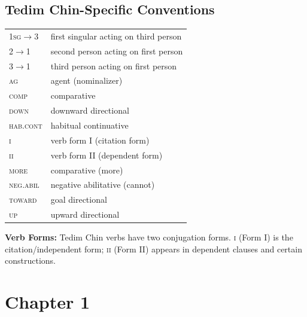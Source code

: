 \documentclass[11pt,a4paper]{article}
\begin{document}
\subsection*{Tedim Chin-Specific Conventions}
\begin{tabular}{@{}ll@{}}
\textsc{1sg$\rightarrow$3} & first singular acting on third person \\
\textsc{2$\rightarrow$1} & second person acting on first person \\
\textsc{3$\rightarrow$1} & third person acting on first person \\
\textsc{ag} & agent (nominalizer) \\
\textsc{comp} & comparative \\
\textsc{down} & downward directional \\
\textsc{hab.cont} & habitual continuative \\
\textsc{i} & verb form I (citation form) \\
\textsc{ii} & verb form II (dependent form) \\
\textsc{more} & comparative (more) \\
\textsc{neg.abil} & negative abilitative (cannot) \\
\textsc{toward} & goal directional \\
\textsc{up} & upward directional \\
\end{tabular}

\vspace{1em}
\noindent\textbf{Verb Forms:} Tedim Chin verbs have two conjugation forms.
\textsc{i} (Form I) is the citation/independent form; \textsc{ii} (Form II)
appears in dependent clauses and certain constructions.

\newpage
\section*{Chapter 1}
\end{document}
